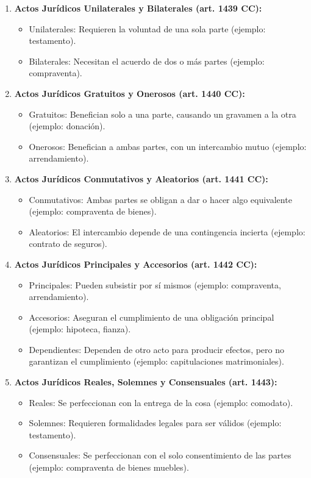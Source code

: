 \documentclass{templateNote}
\begin{document}
\begin{enumerate}
    \item \textbf{Actos Jurídicos Unilaterales y Bilaterales (art. 1439 CC):}
    \begin{itemize}
        \item Unilaterales: Requieren la voluntad de una sola parte (ejemplo: testamento).
        \item Bilaterales: Necesitan el acuerdo de dos o más partes (ejemplo: compraventa).
    \end{itemize}
    \item \textbf{Actos Jurídicos Gratuitos y Onerosos (art. 1440 CC):}
    \begin{itemize}
        \item Gratuitos: Benefician solo a una parte, causando un gravamen a la otra (ejemplo: donación).
        \item Onerosos: Benefician a ambas partes, con un intercambio mutuo (ejemplo: arrendamiento).
    \end{itemize}
    \item \textbf{Actos Jurídicos Conmutativos y Aleatorios (art. 1441 CC):}
    \begin{itemize}
        \item Conmutativos: Ambas partes se obligan a dar o hacer algo equivalente (ejemplo: compraventa de bienes).
        \item Aleatorios: El intercambio depende de una contingencia incierta (ejemplo: contrato de seguros).
    \end{itemize}
    \item \textbf{Actos Jurídicos Principales y Accesorios (art. 1442 CC):}
    \begin{itemize}
        \item Principales: Pueden subsistir por sí mismos (ejemplo: compraventa, arrendamiento).
        \item Accesorios: Aseguran el cumplimiento de una obligación principal (ejemplo: hipoteca, fianza).
        \item Dependientes: Dependen de otro acto para producir efectos, pero no garantizan el cumplimiento (ejemplo: capitulaciones matrimoniales).
    \end{itemize}
    \item \textbf{Actos Jurídicos Reales, Solemnes y Consensuales (art. 1443):}
    \begin{itemize}
        \item Reales: Se perfeccionan con la entrega de la cosa (ejemplo: comodato).
        \item Solemnes: Requieren formalidades legales para ser válidos (ejemplo: testamento).
        \item Consensuales: Se perfeccionan con el solo consentimiento de las partes (ejemplo: compraventa de bienes muebles).
    \end{itemize}
\end{enumerate}
\end{document}
